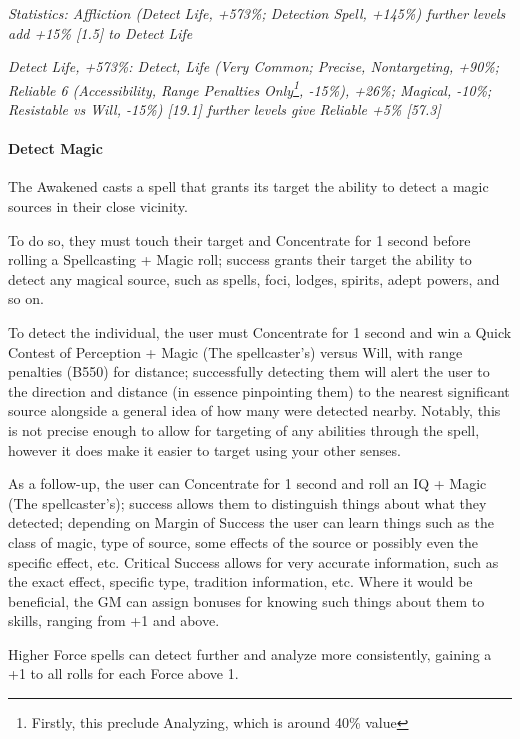 \begin{multicols*}{3}
	\textcolor{OliveGreen}{\textit{ Statistics: Affliction (Detect Life, +573\%; Detection Spell, +145\%) further levels add +15\% [1.5] to Detect Life}}
	
	\textcolor{OliveGreen}{\textit{Detect Life, +573\%: Detect, Life (Very Common; Precise, Nontargeting, +90\%; Reliable 6 (Accessibility, Range Penalties Only\footnote{Firstly, this preclude Analyzing, which is around 40\% value}, -15\%), +26\%; Magical, -10\%; Resistable vs Will, -15\%) [19.1] further levels give Reliable +5\% [57.3]}}
		
	\paragraph{Detect Magic}
	
	The Awakened casts a spell that grants its target the ability to detect a magic sources in their close vicinity.
	
	To do so, they must touch their target and Concentrate for 1 second before rolling a Spellcasting + Magic roll; success grants their target the ability to detect any magical source, such as spells, foci, lodges, spirits, adept powers, and so on.
	
	To detect the individual, the user must Concentrate for 1 second and win a Quick Contest of Perception + Magic (The spellcaster's) versus Will, with range penalties (B550) for distance; successfully detecting them will alert the user to the direction and distance (in essence pinpointing them) to the nearest significant source alongside a general idea of how many were detected nearby. Notably, this is not precise enough to allow for targeting of any abilities through the spell, however it does make it easier to target using your other senses.
	
	As a follow-up, the user can Concentrate for 1 second and roll an IQ + Magic (The spellcaster's); success allows them to distinguish things about what they detected; depending on Margin of Success the user can learn things such as the class of magic, type of source, some effects of the source or possibly even the specific effect, etc. Critical Success allows for very accurate information, such as the exact effect, specific type, tradition information, etc. Where it would be beneficial, the GM can assign bonuses for knowing such things about them to skills, ranging from +1 and above.
	
	Higher Force spells can detect further and analyze more consistently, gaining a +1 to all rolls for each Force above 1.	
	

\end{multicols*}
